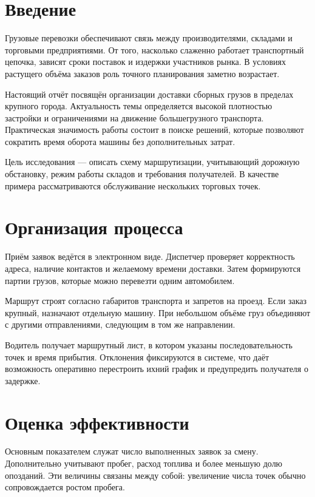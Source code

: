 \chapter{Введение}

Грузовые перевозки обеспечивают связь между производителями, складами и торговыми
предприятиями. От того, насколько слаженно работает транспортный цепочка, зависят
сроки поставок и издержки участников рынка. В условиях растущего объёма заказов
роль точного планирования заметно возрастает.

Настоящий отчёт посвящён организации доставки сборных грузов в пределах крупного
города. Актуальность темы определяется высокой плотностью застройки и
ограничениями на движение большегрузного транспорта. Практическая значимость
работы состоит в поиске решений, которые позволяют сократить время оборота
машины без дополнительных затрат.

Цель исследования — описать схему маршрутизации, учитывающий дорожную обстановку,
режим работы складов и требования получателей. В качестве примера рассматриваются
обслуживание нескольких торговых точек.

\chapter{Организация процесса}

Приём заявок ведётся в электронном виде. Диспетчер проверяет корректность
адреса, наличие контактов и желаемому времени доставки. Затем формируются партии
грузов, которые можно перевезти одним автомобилем.

Маршрут строят согласно габаритов транспорта и запретов на проезд. Если заказ
крупный, назначают отдельную машину. При небольшом объёме груз объединяют с
другими отправлениями, следующим в том же направлении.

Водитель получает маршрутный лист, в котором указаны последовательность точек и
время прибытия. Отклонения фиксируются в системе, что даёт возможность
оперативно перестроить ихний график и предупредить получателя о задержке.

\chapter{Оценка эффективности}

Основным показателем служат число выполненных заявок за смену. Дополнительно
учитывают пробег, расход топлива и более меньшую долю опозданий. Эти величины связаны между
собой: увеличение числа точек обычно сопровождается ростом пробега.

